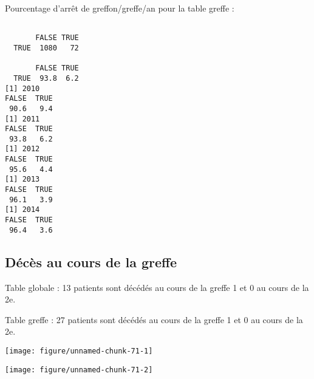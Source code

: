\documentclass[11pt,a4paper]{article}\usepackage[]{graphicx}\usepackage[]{color}
\makeatletter
\def\maxwidth{ %
  \ifdim\Gin@nat@width>\linewidth
    \linewidth
  \else
    \Gin@nat@width
  \fi
}
\newenvironment{kframe}{%
 \def\at@end@of@kframe{}%
 \ifinner\ifhmode%
  \def\at@end@of@kframe{\end{minipage}}%
  \begin{minipage}{\columnwidth}%
 \fi\fi%
 \def\FrameCommand##1{\hskip\@totalleftmargin \hskip-\fboxsep
 \colorbox{shadecolor}{##1}\hskip-\fboxsep
     \hskip-\linewidth \hskip-\@totalleftmargin \hskip\columnwidth}%
 \MakeFramed {\advance\hsize-\width
   \@totalleftmargin\z@ \linewidth\hsize
   \@setminipage}}%
 {\par\unskip\endMakeFramed%
 \at@end@of@kframe}
\newenvironment{knitrout}{}{} %
\makeatother
\begin{document}
Pourcentage d'arrêt de greffon/greffe/an pour la table greffe :

\begin{knitrout}
\color{fgcolor}\begin{kframe}
\begin{verbatim}
      
       FALSE TRUE
  TRUE  1080   72
      
       FALSE TRUE
  TRUE  93.8  6.2
[1] 2010
FALSE  TRUE 
 90.6   9.4 
[1] 2011
FALSE  TRUE 
 93.8   6.2 
[1] 2012
FALSE  TRUE 
 95.6   4.4 
[1] 2013
FALSE  TRUE 
 96.1   3.9 
[1] 2014
FALSE  TRUE 
 96.4   3.6 
\end{verbatim}
\end{kframe}
\end{knitrout}

  \subsection{Décès au cours de la greffe}

Table globale : 13 patients sont décédés au cours de la greffe 1 et 0 au cours de la 2e.

Table greffe : 27 patients sont décédés au cours de la greffe 1 et 0 au cours de la 2e.

\begin{knitrout}
\color{fgcolor}
\texttt{[image: figure/unnamed-chunk-71-1]} 

\texttt{[image: figure/unnamed-chunk-71-2]} 

\end{knitrout}
\end{document}
